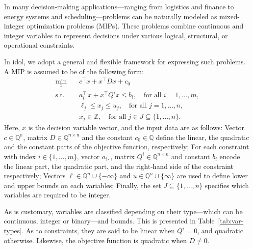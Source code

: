 In many decision-making applications---ranging from logistics and finance to
energy systems and scheduling---problems can be naturally modeled as
mixed-integer optimization problems (MIPs). These problems combine continuous
and integer variables to represent decisions under various logical,
structural, or operational constraints.

In \textsf{idol}, we adopt a general and flexible framework for expressing
such problems. A MIP is assumed to be of the following form:
\begin{subequations}
    \begin{align}
        \min_x \quad & c^\top x + x^\top D x + c_0 \\
        \text{s.t.} \quad 
        & a_{i\cdot}^\top x + x^\top Q^i x \le b_i, \quad \text{for all } i=1,\dotsc,m, \\
        & \ell_j \le x_j \le u_j, \quad \text{for all } j = 1,\dotsc,n, \\
        & x_j\in \mathbb{Z}, \quad \text{for all } j\in J \subseteq\{1,\dotsc,n\}. \label{eq:mip:integer-requirements}
    \end{align}
    \label{eq:mip}
\end{subequations}
Here, $x$ is the decision variable vector, and the input data are as follows:
Vector $c \in \mathbb{Q}^n$, matrix $D\in\mathbb{Q}^{n\times n}$ and the
constant $c_0 \in \mathbb{Q}$ define the linear, the quadratic and the
constant parts of the objective function, respectively; For each constraint
with index $i\in\{1,\dotsc,m\}$, vector $a_{i\cdot}$, matrix $Q^i \in
\mathbb{Q}^{n \times n}$ and constant $b_i$ encode the linear part, the
quadratic part, and the right-hand side of the constraint respectively;
Vectors $\ell \in \mathbb{Q}^n \cup \{-\infty\}$ and $u \in \mathbb{Q}^n \cup
\{\infty\}$ are used to define lower and upper bounds on each variables; Finally, the
set $J \subseteq \{1, \dotsc, n\}$ specifies which variables are required to
be integer.

As is customary, variables are classified depending on their type---which can
be continuous, integer or binary---and bounds. This is presented in
Table~\ref{tab:var-types}. As to constraints, they are said to be linear when
$Q^i = 0$, and quadratic otherwise. Likewise, the objective function is
quadratic when $D \ne 0$. 

